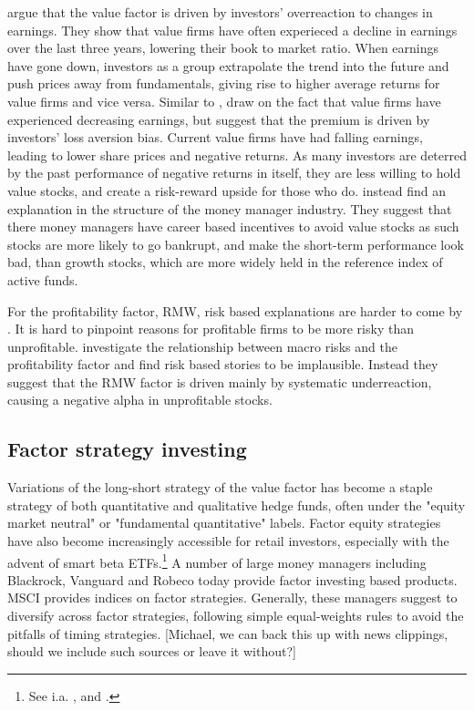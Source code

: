 \textcite{LakonishokShleiferVishny1994} argue that the value factor is driven by investors' overreaction to changes in earnings. They show that value firms have often experieced a decline in earnings over the last three years, lowering their book to market ratio. When earnings have gone down, investors as a group extrapolate the trend into the future and push prices away from fundamentals, giving rise to higher average returns for value firms and vice versa. Similar to \textcite{LakonishokShleiferVishny1994}, \textcite{BarberisHuang2001} draw on the fact that value firms have experienced decreasing earnings, but suggest that the premium is driven by investors' loss aversion bias. Current value firms have had falling earnings, leading to lower share prices and negative returns. As many investors are deterred by the past performance of negative returns in itself, they are less willing to hold value stocks, and create a risk-reward upside for those who do. \textcite{LakonishokShleiferVishny1992} instead find an explanation in the structure of the money manager industry. They suggest that there money managers have career based incentives to avoid value stocks as such stocks are more likely to go bankrupt, and make the short-term performance look bad, than growth stocks, which are more widely held in the reference index of active funds.

For the profitability factor, RMW, risk based explanations are harder to come by \autocite{NovyMarx2013}. It is hard to pinpoint reasons for profitable firms to be more risky than unprofitable. \textcite{Wang2013} investigate the relationship between macro risks and the profitability factor and find risk based stories to be implausible. Instead they suggest that the RMW factor is driven mainly by systematic underreaction, causing a negative alpha in unprofitable stocks.

\subsection{Factor strategy investing}
Variations of the long-short strategy of the value factor has become a staple strategy of both quantitative and qualitative hedge funds, often under the "equity market neutral" or "fundamental quantitative" labels. Factor equity strategies have also become increasingly accessible for retail investors, especially with the advent of smart beta ETFs.\footnote{See i.a. \textcite{Pedersen2015}, \textcite{AQREMN} and \textcite{McKEMN}.} A number of large money managers including Blackrock, Vanguard and Robeco today provide factor investing based products. MSCI provides indices on factor strategies. Generally, these managers suggest to diversify across factor strategies, following simple equal-weights rules to avoid the pitfalls of timing strategies. [Michael, we can back this up with news clippings, should we include such sources or leave it without?]

